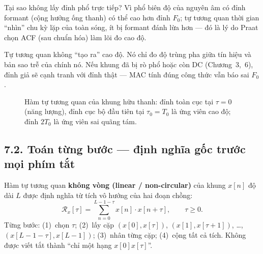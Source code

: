 Tại sao không lấy đỉnh phổ trực tiếp? Vì phổ biên độ của nguyên âm có đỉnh formant (cộng hưởng ống thanh) có thể cao hơn đỉnh $F_0$; tự tương quan thời gian ``nhìn'' chu kỳ lặp của toàn sóng, ít bị formant đánh lừa hơn --- đó là lý do Praat chọn ACF (sau chuẩn hóa) làm lõi đo cao độ.

\begin{physicalinsight}
Tự tương quan không ``tạo ra'' cao độ. Nó chỉ đo độ trùng pha giữa tín hiệu và bản sao trễ của chính nó. Nếu khung đã bị rò phổ hoặc còn DC (Chương~3,~6), đỉnh giả sẽ cạnh tranh với đỉnh thật --- MAC tính đúng công thức vẫn báo sai $F_0$.
\end{physicalinsight}

\begin{figure}[H]
\centering
{}
\caption{Hàm tự tương quan của khung hữu thanh: đỉnh toàn cục tại $\tau=0$ (năng lượng), đỉnh cục bộ đầu tiên tại $\tau_0=T_0$ là ứng viên cao độ; đỉnh $2T_0$ là ứng viên sai quãng tám.}
\label{fig:ch07_acf_peaks}
\end{figure}

\subsection*{7.2. Toán từng bước --- định nghĩa gốc trước mọi phím tắt}

Hàm tự tương quan \textbf{không vòng (linear / non-circular)} của khung $x[n]$ độ dài $L$ được định nghĩa từ tích vô hướng của hai đoạn chồng:
\[
\mathcal{R}_x[\tau] = \sum_{n=0}^{L-1-\tau} x[n]\cdot x[n+\tau], \qquad \tau \ge 0.
\]
Từng bước: (1)~chọn $\tau$; (2)~lấy cặp $(x[0],x[\tau])$, $(x[1],x[\tau+1])$, \ldots, $(x[L-1-\tau],x[L-1])$; (3)~nhân từng cặp; (4)~cộng tất cả tích. Không được viết tắt thành ``chỉ một hạng $x[0]x[\tau]$''.

